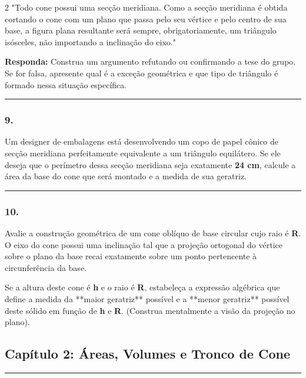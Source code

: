 \documentclass[twoside, 10pt, a4paper]{article}
\newlength{\espacoPosTitulo}\setlength{\espacoPosTitulo}{0.3cm}
\newlength{\espacoPreQuestao}\setlength{\espacoPreQuestao}{0.1cm}
\newlength{\espacoQuestao}\setlength{\espacoQuestao}{0.2cm}
\begin{document}
\begin{multicols*}{2}
"Todo cone possui uma secção meridiana. Como a secção meridiana é obtida cortando o cone com um plano que passa pelo seu vértice e pelo centro de sua base, a figura plana resultante será sempre, obrigatoriamente, um triângulo isósceles, não importando a inclinação do eixo."
\begin{boxresponda}
\textbf{Responda:} Construa um argumento refutando ou confirmando a tese do grupo. Se for falsa, apresente qual é a exceção geométrica e que tipo de triângulo é formado nessa situação específica.
\end{boxresponda}
\par\vspace{\espacoQuestao}

\noindent\textcolor{CorLinha}{\rule{\linewidth}{0.5pt}} 
\par\vspace{\espacoPreQuestao}
\subsubsection*{9.} Um designer de embalagens está desenvolvendo um copo de papel cônico de secção meridiana perfeitamente equivalente a um triângulo equilátero. Se ele deseja que o perímetro dessa secção meridiana seja exatamente \textbf{24 cm}, calcule a área da base do cone que será montado e a medida de sua geratriz.
\par\vspace{\espacoQuestao}

\noindent\textcolor{CorLinha}{\rule{\linewidth}{0.5pt}} 
\par\vspace{\espacoPreQuestao}
\subsubsection*{10.} Avalie a construção geométrica de um cone oblíquo de base circular cujo raio é \textbf{R}. O eixo do cone possui uma inclinação tal que a projeção ortogonal do vértice sobre o plano da base recai exatamente sobre um ponto pertencente à circunferência da base. 

Se a altura deste cone é \textbf{h} e o raio é \textbf{R}, estabeleça a expressão algébrica que define a medida da **maior geratriz** possível e a **menor geratriz** possível deste sólido em função de \textbf{h} e \textbf{R}. (Construa mentalmente a visão da projeção no plano).
\par\vspace{\espacoQuestao}
\subsection*{Capítulo 2: Áreas, Volumes e Tronco de Cone}
\vspace{-0.2cm}\noindent\rule{\linewidth}{1.5pt} 
\par\vspace{\espacoPosTitulo}

\end{multicols*}
\end{document}
